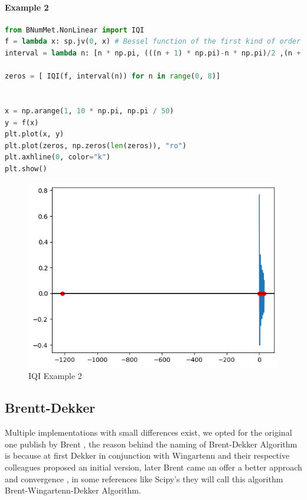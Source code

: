 \paragraph{Example 2}{
\begin{lstlisting}[language=Python]
from BNumMet.NonLinear import IQI
f = lambda x: sp.jv(0, x) # Bessel function of the first kind of order 0
interval = lambda n: [n * np.pi, (((n + 1) * np.pi)-n * np.pi)/2 ,(n + 1) * np.pi] # Interval for the n-th zero

zeros = [ IQI(f, interval(n)) for n in range(0, 8)]


x = np.arange(1, 10 * np.pi, np.pi / 50)
y = f(x)
plt.plot(x, y)
plt.plot(zeros, np.zeros(len(zeros)), "ro")
plt.axhline(0, color="k")
plt.show()
\end{lstlisting}

\begin{figure}[H]
    \centering
    \includegraphics{Include/Images/Thesis/Documentation/NonLinear/IQI Example 2.png}
    \caption{IQI Example 2}
    \label{fig:IQI Example 2}
\end{figure}
}

\subsection{Brentt-Dekker}
Multiple implementations with small differences exist, we opted for the original one publish by Brent \cite{brent2002algorithms}, the reason behind the naming of Brent-Dekker Algorithm is because at first Dekker in conjunction with Wingartenn and their respective colleagues proposed an initial version, later Brent came an offer a better approach and convergence \cite{Press2007}, in some references like Scipy's they will call this algorithm Brent-Wingartenn-Dekker Algorithm.


